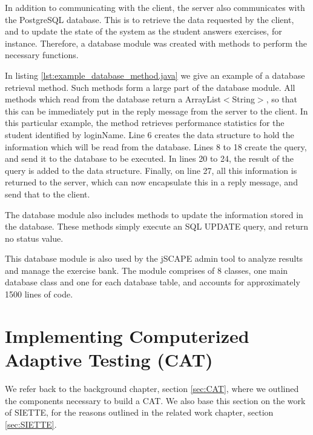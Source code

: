 

In addition to communicating with the client, the server also communicates with the PostgreSQL database. This is to retrieve the data requested by the client, and to update the state of the system as the student answers exercises, for instance. Therefore, a database module was created with methods to perform the necessary functions. \newline



In listing \ref{lst:example_database_method.java} we give an example of a database retrieval method. Such methods form a large part of the database module. All methods which read from the database return a \textsf{ArrayList$<$String$>$}, so that this can be immediately put in the reply message from the server to the client. In this particular example, the method retrieves performance statistics for the student identified by \textsf{loginName}. Line 6 creates the data structure to hold the information which will be read from the database. Lines 8 to 18 create the query, and send it to the database to be executed. In lines 20 to 24, the result of the query is added to the data structure. Finally, on line 27, all this information is returned to the server, which can now encapsulate this in a reply message, and send that to the client.\newline

The database module also includes methods to update the information stored in the database. These methods simply execute an SQL \textsf{UPDATE} query, and return no status value. \newline

This database module is also used by the jSCAPE admin tool to analyze results and manage the exercise bank. The module comprises of 8 classes, one main database class and one for each database table, and accounts for approximately 1500 lines of code.

\section{Implementing Computerized Adaptive Testing (CAT)}
\label{sec:implementing-cat}
We refer back to the background chapter, section \ref{sec:CAT}, where we outlined the components necessary to build a CAT. We also base this section on the work of SIETTE, for the reasons outlined in the related work chapter, section \ref{sec:SIETTE}.\newline

